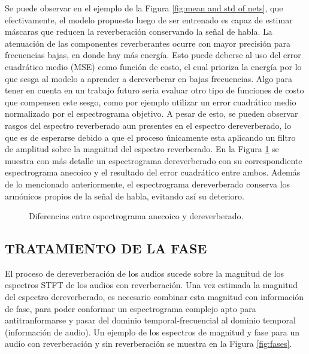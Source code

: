 Se puede observar en el ejemplo de la Figura \ref{fig:mean and std of nets}, que efectivamente, el modelo propuesto luego de ser entrenado es capaz de estimar máscaras que reducen la reverberación conservando la señal de habla. 
La atenuación de las componentes reverberantes ocurre con mayor precisión para frecuencias bajas, en donde hay más energía. Esto puede deberse al uso del error cuadrático medio (MSE) como función de costo, el cual prioriza la energía por lo que sesga al modelo a aprender a dereverberar en bajas frecuencias. Algo para tener en cuenta en un trabajo futuro seria evaluar otro tipo de funciones de costo que compensen este sesgo, como por ejemplo utilizar un error cuadrático medio normalizado por el espectrograma objetivo.
A pesar de esto, se pueden observar rasgos del espectro reverberado aun presentes en el espectro dereverberado, lo que es de esperarse debido a que el proceso únicamente esta aplicando un filtro de amplitud sobre la magnitud del espectro reverberado. En la Figura \ref{fig:zoom} se muestra con más detalle un espectrograma dereverberado con su correspondiente espectrograma anecoico y el resultado del error cuadrático entre ambos. Además de lo mencionado anteriormente, el espectrograma dereverberado conserva los armónicos propios de la señal de habla, evitando así su deterioro.

\begin{figure}[H]\centering
{}\hfill
{}\par 
{}
\caption{Diferencias entre espectrograma anecoico y dereverberado.}
\label{fig:zoom}
\end{figure}


\subsection[Tratamiento de la Fase]{TRATAMIENTO DE LA FASE}
El proceso de dereverberación de los audios sucede sobre la magnitud de los espectros STFT de los audios con reverberación. Una vez estimada la magnitud del espectro dereverberado, es necesario combinar esta magnitud con información de fase, para poder conformar un espectrograma complejo apto para antitranformarse y pasar del dominio temporal-frecuencial al dominio temporal (información de audio). Un ejemplo de los espectros de magnitud y fase para un audio con reverberación y sin reverberación se muestra en la Figura \ref{fig:fases}.

